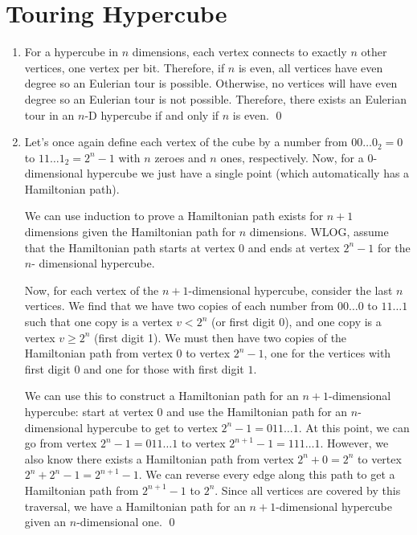 \documentclass{article}
\begin{document}
	\section{Touring Hypercube}	
	\begin{enumerate}[label=\alph*.]
		\item For a hypercube in $n$ dimensions, each vertex connects to exactly $n$ 
		other vertices, one vertex per bit. Therefore, if $n$ is even, all vertices have 
		even degree so an Eulerian tour is possible. Otherwise, no vertices will have even 
		degree so an Eulerian tour is not possible. Therefore, there exists an Eulerian 
		tour in an $n$-D hypercube if and only if $n$ is even. \qed
		\item Let's once again define each vertex of the cube by a number from $00\ldots0_2 = 0$
		to $11\ldots1_2 = 2^n-1$ with $n$ zeroes and $n$ ones, respectively. Now, for a $0$-dimensional
		hypercube we just have a single point (which automatically has a Hamiltonian path).

		We can use induction to prove a Hamiltonian path exists for $n+1$ dimensions given the 
		Hamiltonian path for $n$ dimensions.
		WLOG, assume that the Hamiltonian path starts at vertex $0$ and ends at vertex $2^n-1$ for the $n$-
		dimensional hypercube.

		Now, for each vertex of the $n+1$-dimensional hypercube, consider the last $n$ vertices. 
		We find that we have two copies of each number from $00\ldots0$ to $11\ldots1$ such that 
		one copy is a vertex $v < 2^n$ (or first digit $0$), and one copy is a vertex $v \geq 2^n$
		(first digit 1). We must then have two copies of the Hamiltonian path from vertex $0$ to vertex $2^n-1$, 
		one for the vertices with first digit $0$ and one for those with first digit $1$.
		
		We can use this to construct a Hamiltonian path for an $n+1$-dimensional hypercube:
		start at vertex $0$ and use the Hamiltonian path for an $n$-dimensional hypercube to get to vertex 
		$2^n-1
		= 011\ldots1$. At this point, we can go from vertex $2^n-1 = 011\ldots1$ to vertex $2^{n+1}-1 = 
		111\ldots1$.
		However, we also know there exists a Hamiltonian path from vertex $2^n+0 = 2^n$ to vertex 
		$2^n+2^n-1 = 2^{n+1}-1$. We can reverse every edge along this path to get a Hamiltonian 
		path from $2^{n+1}-1$ to $2^n$. Since all vertices are covered by this traversal, we have a
		Hamiltonian path for an $n+1$-dimensional hypercube given an $n$-dimensional one. \qed
	\end{enumerate}
\end{document}

